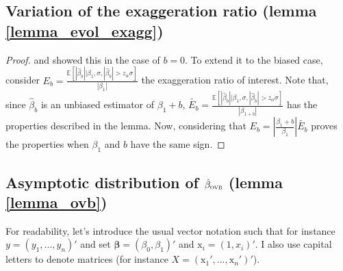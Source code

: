 \documentclass[usletter, 12pt]{article}
\begin{document}

		\subsection{Variation of the exaggeration ratio (lemma \ref{lemma_evol_exagg})}
			
			\begin{proof}
				\cite{lu_note_2019} and \cite{zwet_significance_2021} showed this in the case of $b = 0$. 
				To extend it to the biased case, consider 
				$E_{b} = \frac{\mathbb{E}\left[ |\hat{\beta}_{b}| \big| \beta_{1}, \sigma, |\hat{\beta}_{b}| > z_{\alpha} \sigma \right]}{|\beta_{1}|}$ the exaggeration ratio of interest. 
				Note that, since $\hat{\beta}_{b}$ is an unbiased estimator of $\beta_{1} + b$, $\tilde{E_{b}} = \frac{\mathbb{E}\left[ |\hat{\beta}_{b}| \big| \beta_{1}, \sigma, |\hat{\beta}_{b}| > z_{\alpha} \sigma \right]}{|\beta_{1 + b}|}$ has the properties described in the lemma. 
				Now, considering that $E_{b} = \left| \frac{\beta_{1} + b}{\beta_{1}} \right| \tilde{E_{b}}$ proves the properties when $\beta_{1}$ and $b$ have the same sign.
			\end{proof}
	

\subsection{Asymptotic distribution of $\hat{\beta}_{\textsc{ovb}}$ (lemma \ref{lemma_ovb})}
			
			For readability, let's introduce the usual vector notation such that for instance $y = (y_1, ..., y_n)'$ and set $\bm{\beta} = (\beta_0, \beta_1)'$ and $\text{x}_i = (1, x_i)'$. I also use capital letters to denote matrices (for instance $X = (\text{x}_{1}', ..., \text{x}_{n}')'$).\\
			
\end{document}
